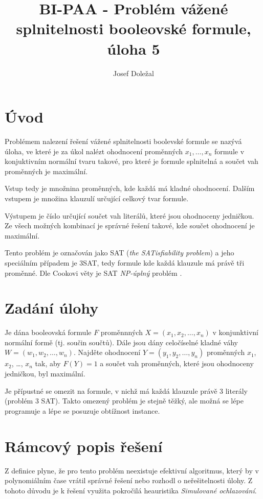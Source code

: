 \documentclass[czech]{article}
\title{BI-PAA - Problém vážené splnitelnosti booleovské formule, úloha 5}
\author{Josef Doležal}
\begin{document}
\maketitle

\newpage

\section{Úvod}
Problémem nalezení řešení vážené splnitelnosti boolevské formule se nazývá úloha, ve které je za úkol nalézt ohodnocení proměnných $x_1, \dots, x_n$ formule v konjuktivním normální tvaru takové, pro které je formule splnitelná a součet vah proměnných je maximální.

Vstup tedy je množnina proměnných, kde každá má kladné ohodnocení.
Dalším vstupem je množina klauzulí určující celkový tvar formule.

Výstupem je číslo určující součet vah literálů, které jsou ohodnoceny jedničkou.
Ze všech možných kombinací je správné řešení takové, kde součet ohodnocení je maximální.

Tento problém je označován jako SAT (\textit{the SATisfiability problem}) a jeho speciálním případem je 3SAT, tedy formule kde každá klauzule má právě tři proměnné.
Dle Cookovi věty je SAT \textit{NP-úplný} problém \citep{sat-npc}.

\section{Zadání úlohy}

Je dána booleovská formule $F$ proměnnných $X=(x_1, x_2, \dots, x_n)$ v konjunktivní normální formě (tj. součin součtů).
Dále jsou dány celočíselné kladné váhy $W=(w_1, w_2, \dots, w_n)$.
Najděte ohodnocení $Y=(y_1, y_2, \dots, y_n)$ proměnných $x_1$, $x_2$, \dots, $x_n$ tak, aby $F(Y)=1$ a součet vah proměnných, které jsou ohodnoceny jedničkou, byl maximální.

Je přípustné se omezit na formule, v nichž má každá klauzule právě 3 literály (problém 3 SAT).
Takto omezený problém je stejně těžký, ale možná se lépe programuje a lépe se posuzuje obtížnost instance.

\section{Rámcový popis řešení}

Z definice plyne, že pro tento problém neexistuje efektivní algoritmus, který by v polynomiálním čase vrátil správné řešení nebo rozhodl o neřešitelnosti úlohy.
Z tohoto důvodu je k řešení využita pokročilá heauristika \textit{Simulované ochlazování}.
\end{document}
